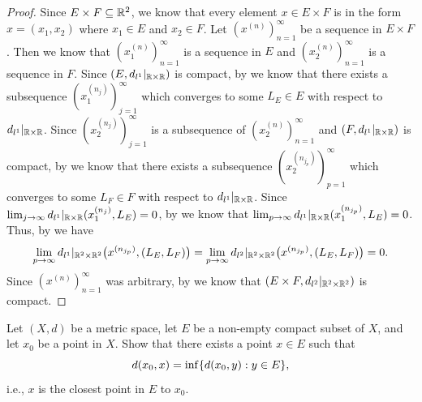 \begin{proof}
  Since \(E \times F \subseteq \mathbb{R}^2\), we know that every element \(x \in E \times F\) is in the form \(x = (x_1, x_2)\) where \(x_1 \in E\) and \(x_2 \in F\).
  Let \((x^{(n)})_{n = 1}^\infty\) be a sequence in \(E \times F\).
  Then we know that \((x_1^{(n)})_{n = 1}^\infty\) is a sequence in \(E\) and \((x_2^{(n)})_{n = 1}^\infty\) is a sequence in \(F\).
  Since \((E, d_{l^1}|_{\mathbb{R} \times \mathbb{R}})\) is compact, by  we know that there exists a subsequence \((x_1^{(n_j)})_{j = 1}^\infty\) which converges to some \(L_E \in E\) with respect to \(d_{l^1}|_{\mathbb{R} \times \mathbb{R}}\).
  Since \((x_2^{(n_j)})_{j = 1}^\infty\) is a subsequence of \((x_2^{(n)})_{n = 1}^\infty\) and \((F, d_{l^1}|_{\mathbb{R} \times \mathbb{R}})\) is compact, by  we know that there exists a subsequence \((x_2^{(n_{j_p})})_{p = 1}^\infty\) which converges to some \(L_F \in F\) with respect to \(d_{l^1}|_{\mathbb{R} \times \mathbb{R}}\).
  Since \(\lim_{j \to \infty} d_{l^1}|_{\mathbb{R} \times \mathbb{R}}(x_1^{(n_j)}, L_E) = 0\), by  we know that \(\lim_{p \to \infty} d_{l^1}|_{\mathbb{R} \times \mathbb{R}}(x_1^{(n_{j_p})}, L_E) = 0\).
  Thus, by  we have
  \[
    \lim_{p \to \infty} d_{l^1}|_{\mathbb{R}^2 \times \mathbb{R}^2}\big(x^{(n_{j_p})}, (L_E, L_F)\big) = \lim_{p \to \infty} d_{l^2}|_{\mathbb{R}^2 \times \mathbb{R}^2}\big(x^{(n_{j_p})}, (L_E, L_F)\big) = 0.
  \]
  Since \((x^{(n)})_{n = 1}^\infty\) was arbitrary, by  we know that \((E \times F, d_{l^2}|_{\mathbb{R}^2 \times \mathbb{R}^2})\) is compact.
\end{proof}

\begin{ex}\label{ii:ex:1.5.14}
  Let \((X, d)\) be a metric space, let \(E\) be a non-empty compact subset of \(X\), and let \(x_0\) be a point in \(X\).
  Show that there exists a point \(x \in E\) such that
  \[
    d(x_0, x) = \inf\set{d(x_0, y) : y \in E},
  \]
  i.e., \(x\) is the closest point in \(E\) to \(x_0\).
\end{ex}

